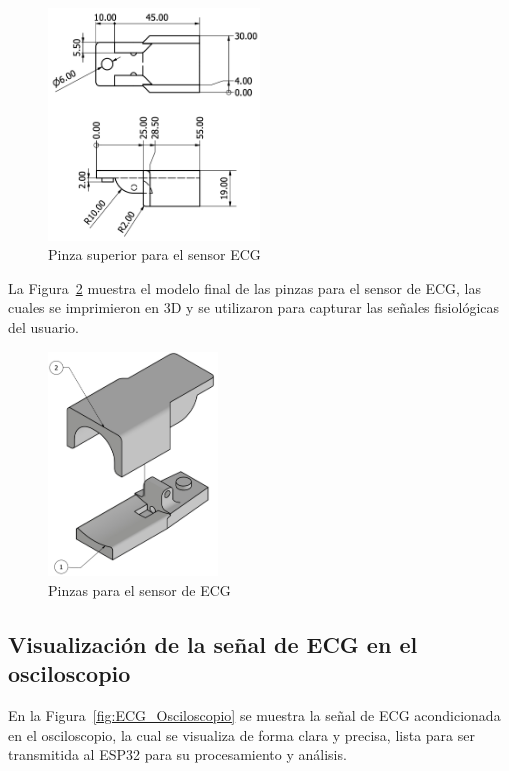     \begin{figure}[H]
        \centering
        \includegraphics[width=0.5\textwidth]{img/Desarrollo/pinza_superior.png}
        \caption{Pinza superior para el sensor ECG}
        \label{fig:Pinza_Superior}
    \end{figure}

    La Figura~\ref{fig:Pinzas_ECG} muestra el modelo final de las pinzas para el sensor de ECG, las cuales se imprimieron en 3D y se utilizaron para capturar las señales fisiológicas del usuario.

    \begin{figure}[H]
        \centering
        \includegraphics[width=0.4\textwidth]{img/Desarrollo/pinzas_electrocardiograma.png}
        \caption{Pinzas para el sensor de ECG}
        \label{fig:Pinzas_ECG}
    \end{figure}

    \subsection{Visualización de la señal de ECG en el osciloscopio}

    En la Figura~\ref{fig:ECG_Osciloscopio} se muestra la señal de ECG acondicionada en el osciloscopio, la cual se visualiza de forma clara y precisa, lista para ser transmitida al ESP32 para su procesamiento y análisis.

